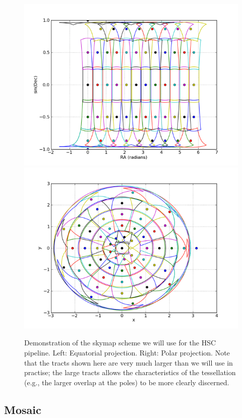 \documentclass[12pt]{article}
\begin{document}
\begin{figure}[!htbp]
    \centering
    \includegraphics[scale=0.3]{figures/rings_equat.png}
    \includegraphics[scale=0.3]{figures/rings_pole.png}
    \caption{Demonstration of the skymap scheme we will use for the HSC pipeline.  Left: Equatorial
      projection.  Right: Polar projection.  Note that the tracts shown here are very much larger than we will
      use in practise; the large tracts allows the characteristics of the tessellation (e.g., the larger
      overlap at the poles) to be more clearly discerned.\label{fig:skymap}}
\end{figure}

\subsection{Mosaic}
\end{document}
